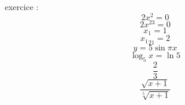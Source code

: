 \documentclass[11pt]{article}
\begin{document}
exercice :
$$2x^2 = 0$$
$$2x^{23} = 0$$
$$ x_1 = 1 $$
$${x_1}_21 = 2 $$
$$ y = 5\sin{\pi}x$$
$$\log_5{x}=\ln{5}$$
$$\displaystyle{\frac{2}{3}}$$
$$\frac{\sqrt{x+1}}{\sqrt[5]{x+1}}$$ 
\end{document}
